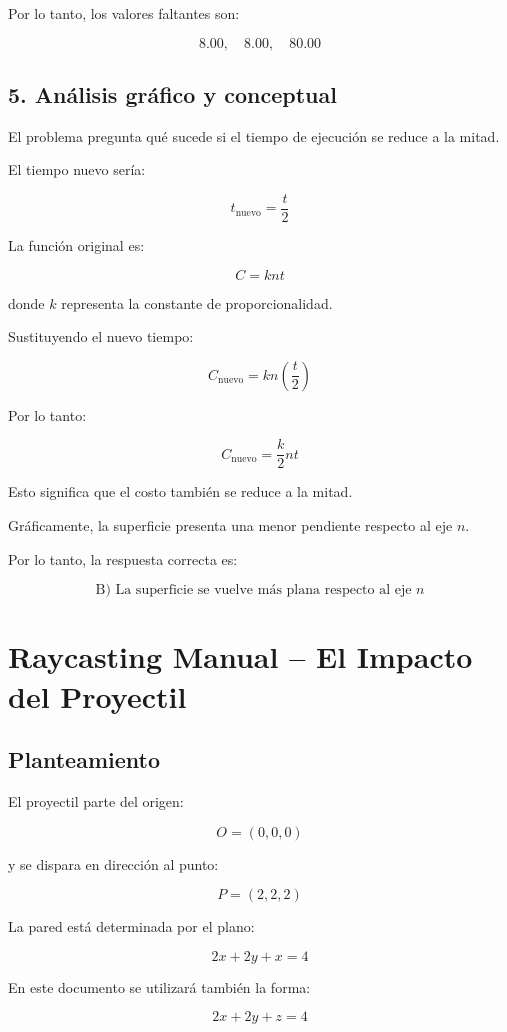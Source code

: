 \documentclass[12pt,a4paper]{article}
\begin{document}
Por lo tanto, los valores faltantes son:

\[\boxed{8.00,\quad 8.00,\quad 80.00}\]

\subsection{5. Análisis gráfico y conceptual}

El problema pregunta qué sucede si el tiempo de ejecución se reduce
a la mitad.

El tiempo nuevo sería:

\[t_{\text{nuevo}}=\frac{t}{2}\]

La función original es:

\[C=kn t\]

donde $k$ representa la constante de proporcionalidad.

Sustituyendo el nuevo tiempo:

\[C_{\text{nuevo}}=kn\left(\frac{t}{2}\right)\]

Por lo tanto:

\[C_{\text{nuevo}}=\frac{k}{2}nt\]

Esto significa que el costo también se reduce a la mitad.

Gráficamente, la superficie presenta una menor pendiente respecto
al eje $n$.

Por lo tanto, la respuesta correcta es:

\[\boxed{\text{B) La superficie se vuelve más plana respecto al eje }n}\]


\section{Raycasting Manual -- El Impacto del Proyectil}

\subsection{Planteamiento}

El proyectil parte del origen:

\[O=(0,0,0)\]

y se dispara en dirección al punto:

\[P=(2,2,2)\]

La pared está determinada por el plano:

\[2x+2y+x=4\]

En este documento se utilizará también la forma:

\[2x+2y+z=4\]
\end{document}
